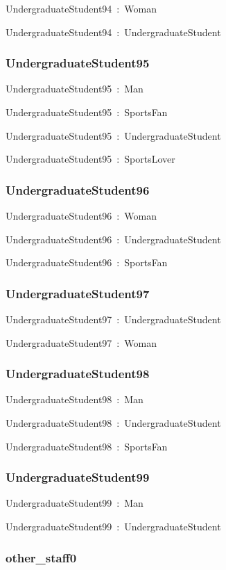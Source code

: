 \documentclass{article}
\begin{document}
UndergraduateStudent94~:~Woman

UndergraduateStudent94~:~UndergraduateStudent

\subsubsection*{UndergraduateStudent95}

UndergraduateStudent95~:~Man

UndergraduateStudent95~:~SportsFan

UndergraduateStudent95~:~UndergraduateStudent

UndergraduateStudent95~:~SportsLover

\subsubsection*{UndergraduateStudent96}

UndergraduateStudent96~:~Woman

UndergraduateStudent96~:~UndergraduateStudent

UndergraduateStudent96~:~SportsFan

\subsubsection*{UndergraduateStudent97}

UndergraduateStudent97~:~UndergraduateStudent

UndergraduateStudent97~:~Woman

\subsubsection*{UndergraduateStudent98}

UndergraduateStudent98~:~Man

UndergraduateStudent98~:~UndergraduateStudent

UndergraduateStudent98~:~SportsFan

\subsubsection*{UndergraduateStudent99}

UndergraduateStudent99~:~Man

UndergraduateStudent99~:~UndergraduateStudent

\subsubsection*{other\_staff0}
\end{document}
